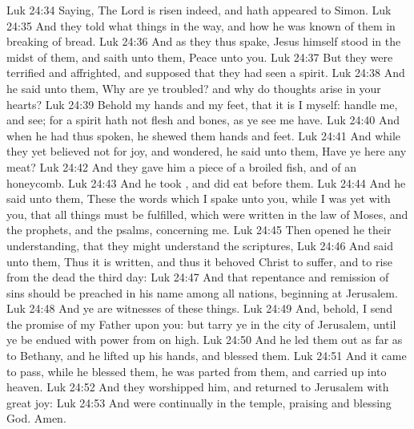 \vs Luk 24:34 Saying, The Lord is risen indeed, and hath appeared to Simon.
\vs Luk 24:35 And they told what things  in the way, and how he was known of them in breaking of bread.
\vs Luk 24:36 And as they thus spake, Jesus himself stood in the midst of them, and saith unto them, Peace  unto you.
\vs Luk 24:37 But they were terrified and affrighted, and supposed that they had seen a spirit.
\vs Luk 24:38 And he said unto them, Why are ye troubled? and why do thoughts arise in your hearts?
\vs Luk 24:39 Behold my hands and my feet, that it is I myself: handle me, and see; for a spirit hath not flesh and bones, as ye see me have.
\vs Luk 24:40 And when he had thus spoken, he shewed them  hands and  feet.
\vs Luk 24:41 And while they yet believed not for joy, and wondered, he said unto them, Have ye here any meat?
\vs Luk 24:42 And they gave him a piece of a broiled fish, and of an honeycomb.
\vs Luk 24:43 And he took , and did eat before them.
\vs Luk 24:44 And he said unto them, These  the words which I spake unto you, while I was yet with you, that all things must be fulfilled, which were written in the law of Moses, and  the prophets, and  the psalms, concerning me.
\vs Luk 24:45 Then opened he their understanding, that they might understand the scriptures,
\vs Luk 24:46 And said unto them, Thus it is written, and thus it behoved Christ to suffer, and to rise from the dead the third day:
\vs Luk 24:47 And that repentance and remission of sins should be preached in his name among all nations, beginning at Jerusalem.
\vs Luk 24:48 And ye are witnesses of these things.
\vs Luk 24:49 And, behold, I send the promise of my Father upon you: but tarry ye in the city of Jerusalem, until ye be endued with power from on high.
\vs Luk 24:50 And he led them out as far as to Bethany, and he lifted up his hands, and blessed them.
\vs Luk 24:51 And it came to pass, while he blessed them, he was parted from them, and carried up into heaven.
\vs Luk 24:52 And they worshipped him, and returned to Jerusalem with great joy:
\vs Luk 24:53 And were continually in the temple, praising and blessing God. Amen.
